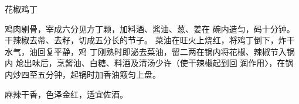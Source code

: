 \begin{recipe}{花椒鸡丁}

\ingredients




\cooking

鸡肉剔骨，宰成六分见方丁颗，加料酒、酱油、葱、姜在 碗内造匀，码十分钟。干辣椒去蒂、去籽，切成五分长的节子。 菜油在旺火上烧红，将鸡丁倒下，炸干水气，油回复平静，鸡 丁刚熟时即泌去菜油，留二两在锅内将花椒、辣椒节入锅内 炝出味后，烹酱油、白糖、料酒及清汤少许（使干辣椒起到回 润作用〉，在锅内炒四至五分钟，起锅时加香油簸匀上盘。

\notes

麻辣干香，色泽金红，适宜佐酒。

\end{recipe}

